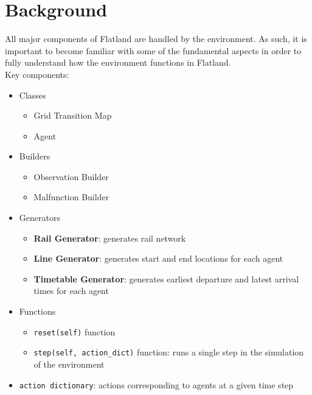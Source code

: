 \section{Background}\label{sec:background}

All major components of Flatland are handled by the environment.  As such, it is important to become familiar with some of the fundamental aspects in order to fully understand how the environment functions in Flatland. \\

\noindent Key components:
\begin{vwcol}[widths={0.25,0.75},
 sep=.8cm, justify=flush,rule=0pt,indent=1em] 
\begin{multicols}{2}
\begin{itemize}
	\item Classes
	\begin{itemize}
		\item Grid Transition Map
		\item Agent
	\end{itemize}
	\item Builders
	\begin{itemize}
		\item Observation Builder
		\item Malfunction Builder
	\end{itemize}
	\columnbreak
	\item Generators
	\begin{itemize}
		\item \textbf{Rail Generator}: generates rail network
		\item \textbf{Line Generator}: generates start and end locations for each agent
		\item \textbf{Timetable Generator}: generates earliest departure and latest arrival times for each agent
	\end{itemize}
	\item Functions
	\begin{itemize}
		\item \texttt{reset(self)} function
		\item \texttt{step(self, action\_dict)} function: runs a single step in the simulation of the environment
	\end{itemize}
	\item \texttt{action dictionary}: actions corresponding to agents at a given time step
\end{itemize}
\end{multicols}
\end{vwcol}